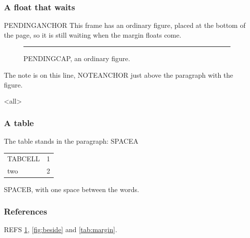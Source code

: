 \mode*
\begin{frame}
  \frametitle{A float that waits}
  PENDINGANCHOR This frame has an ordinary figure, placed at the bottom
  of the page, so it is still waiting when the margin floats come.
  \begin{figure}[b]
    \centering
    \rule{0.5\linewidth}{1.5cm}
    \caption{PENDINGCAP, an ordinary figure.}\label{fig:pending}
  \end{figure}
\end{frame}

\lipsum[1][1-6] The note is on this line,
NOTEANCHOR
just above the paragraph with the figure.

\mode<all>

\mode*

\begin{frame}
  \frametitle{A table}
  The table stands in the paragraph: SPACEA \begin{margintable}
    \caption{MTABCAP, a table in the margin.}\label{tab:margin}
    \begin{tabular}{lr}
      TABCELL & 1 \\
      two & 2 \\
    \end{tabular}
  \end{margintable} SPACEB, with one space between the words.
  \lipsum[3][1-4]
\end{frame}

\begin{frame}
  \frametitle{References}
  REFS \cref{fig:pending}, \cref{fig:beside} and \cref{tab:margin}.
\end{frame}

